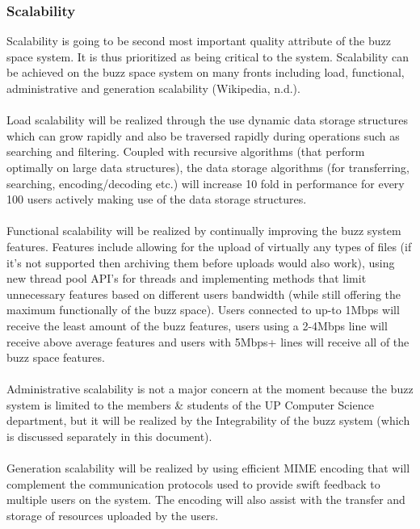 \subsubsection{Scalability}
Scalability is going to be second most important quality attribute of the buzz space system. It is thus prioritized as being critical to the system. Scalability can be achieved on the buzz space system on many fronts including load, functional, administrative and generation scalability (Wikipedia, n.d.).\\
\\
Load scalability will be realized through the use dynamic data storage structures which can grow rapidly and also be traversed rapidly during operations such as searching and filtering. Coupled with recursive algorithms (that perform optimally on large data structures), the data storage algorithms (for transferring, searching, encoding/decoding etc.) will increase 10 fold in performance for every 100 users actively making use of the data storage structures.\\
\\
Functional scalability will be realized by continually improving the buzz system features. Features include allowing for the upload of virtually any types of files (if it’s not supported then archiving them before uploads would also work), using new thread pool API’s for threads and implementing methods that limit unnecessary features based on different users bandwidth (while still offering the maximum functionally of the buzz space). Users connected to up-to 1Mbps will receive the least amount of the buzz features, users using a 2-4Mbps line will receive above average features and users with 5Mbps+ lines will receive all of the buzz space features.\\
\\ 
Administrative scalability is not a major concern at the moment because the buzz system is limited to the members & students of the UP Computer Science department, but it will be realized by the Integrability of the buzz system (which is discussed separately in this document).\\
\\
Generation scalability will be realized by using efficient MIME encoding that will complement the communication protocols used to provide swift feedback to multiple users on the system. The encoding will also assist with the transfer and storage of resources uploaded by the users.     
